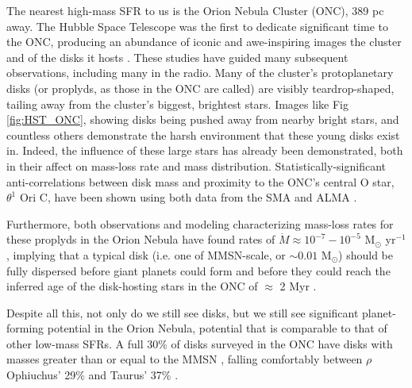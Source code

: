 The nearest high-mass SFR to us is the Orion Nebula Cluster (ONC), 389 pc away. The Hubble Space Telescope was the first to dedicate significant time to the ONC, producing an abundance of iconic and awe-inspiring images the cluster and of the disks it hosts \citep{Ricci2008}. These studies have guided many subsequent observations, including many in the radio. Many of the cluster's protoplanetary disks (or proplyds, as those in the ONC are called) are visibly teardrop-shaped, tailing away from the cluster's biggest, brightest stars. Images like Fig \ref{fig:HST_ONC}, showing disks being pushed away from nearby bright stars, and countless others demonstrate the harsh environment that these young disks exist in. Indeed, the influence of these large stars has already been demonstrated, both in their affect on mass-loss rate and mass distribution. Statistically-significant anti-correlations between disk mass and proximity to the ONC's central O star, $\theta^1$ Ori C, have been shown using both data from the SMA \citep{MannWilliams2009} and ALMA \citep{Mann2014,Ansdell2017,Eisner2018}.


Furthermore, both observations \citep{HenneyODell1999} and modeling \citep{Haworth2016} characterizing mass-loss rates for these proplyds in the Orion Nebula have found rates of $\dot{M} \approx 10^{-7}-10^{-5}$ M$_{\odot}$ yr$^{-1}$, implying that a typical disk (i.e. one of MMSN-scale, or $\sim0.01$ M$_{\odot}$) should be fully dispersed before giant planets could form \citep{Hubickyj2005} and before they could reach the inferred age of the disk-hosting stars in the ONC of $\approx$ 2 Myr \citep{Reggiani2011}.


  
Despite all this, not only do we still see disks, but we still see significant planet-forming potential in the Orion Nebula, potential that is comparable to that of other low-mass SFRs. A full 30\% of disks surveyed in the ONC have disks with masses greater than or equal to the MMSN \citep{Mann2014}, falling comfortably between $\rho$ Ophiuchus' 29\% \cite{AndrewsWilliams2005} and Taurus' 37\% \citep{AndrewsWilliams2007}.


